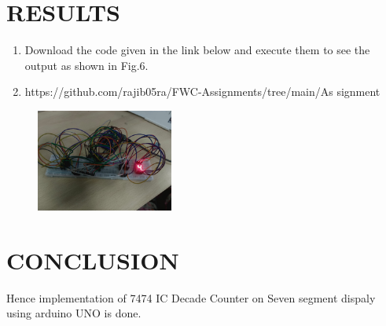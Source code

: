 \documentclass[conference]{IEEEtran}
\begin{document}
 \section{RESULTS}
 \begin{enumerate}
         \item Download the code given in the link below and execute them to see the output as shown in Fig.6.                                           \item https://github.com/rajib05ra/FWC-Assignments/tree/main/As
signment%
 \end{enumerate}
                 \begin{figure}[h]
        \centering
        \includegraphics[width=0.4\textwidth]{fwc1.jpg}
        \caption{\label{fig-6:Gates}}
\end{figure}
\section{CONCLUSION}
Hence implementation of 7474 IC Decade Counter on Seven segment dispaly
using arduino UNO is done.
\end{document}
